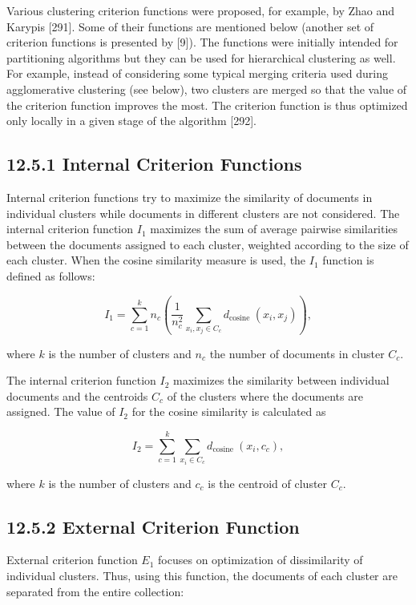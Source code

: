 \documentclass[10pt]{book}
\begin{document}
Various clustering criterion functions were proposed, for example, by Zhao and Karypis [291]. Some of their functions are mentioned below (another set of criterion functions is presented by [9]). The functions were initially intended for partitioning algorithms but they can be used for hierarchical clustering as well. For example, instead of considering some typical merging criteria used during agglomerative clustering (see below), two clusters are merged so that the value of the criterion function improves the most. The criterion function is thus optimized only locally in a given stage of the algorithm [292].

\subsection*{12.5.1 Internal Criterion Functions}
Internal criterion functions try to maximize the similarity of documents in individual clusters while documents in different clusters are not considered. The internal criterion function $I_{1}$ maximizes the sum of average pairwise similarities between the documents assigned to each cluster, weighted according to the size of each cluster. When the cosine similarity measure is used, the $I_{1}$ function is defined as follows:


\begin{equation*}
I_{1}=\sum_{c=1}^{k} n_{c}\left(\frac{1}{n_{c}^{2}} \sum_{x_{i}, x_{j} \in C_{c}} d_{\text {cosine }}\left(x_{i}, x_{j}\right)\right), \tag{12.15}
\end{equation*}


where $k$ is the number of clusters and $n_{c}$ the number of documents in cluster $C_{c}$.

The internal criterion function $I_{2}$ maximizes the similarity between individual documents and the centroids $C_{c}$ of the clusters where the documents are assigned. The value of $I_{2}$ for the cosine similarity is calculated as


\begin{equation*}
I_{2}=\sum_{c=1}^{k} \sum_{x_{i} \in C_{c}} d_{\text {cosine }}\left(x_{i}, c_{c}\right), \tag{12.16}
\end{equation*}


where $k$ is the number of clusters and $c_{c}$ is the centroid of cluster $C_{c}$.

\subsection*{12.5.2 External Criterion Function}
External criterion function $E_{1}$ focuses on optimization of dissimilarity of individual clusters. Thus, using this function, the documents of each cluster are separated from the entire collection:
\end{document}
